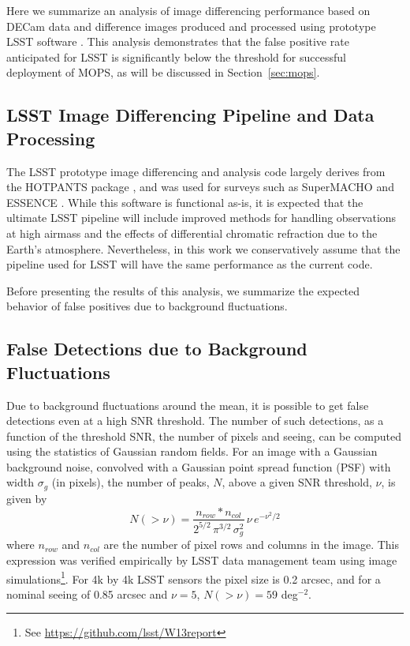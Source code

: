 Here we summarize an analysis of image differencing performance based on DECam
data and difference images produced and processed using prototype LSST
software \citep{DMTN-006}. This analysis demonstrates that the false
positive rate anticipated for LSST is significantly below the threshold for
successful deployment of MOPS, as will be discussed in Section~\ref{sec:mops}.

\subsection{LSST Image Differencing Pipeline and Data Processing}

The LSST prototype image differencing and analysis code largely derives from the
HOTPANTS package \citep{becker15}, and was used for surveys such as SuperMACHO
\citep{becker05} and ESSENCE \citep{miknaitis07}. While this software is
functional as-is, it is expected that the ultimate LSST pipeline will include
improved methods for handling observations at high airmass and the effects of
differential chromatic refraction due to the Earth's atmosphere. Nevertheless, in
this work we conservatively assume that the pipeline used for LSST will have the
same performance as the current code.

Before presenting the results of this analysis, we summarize the expected behavior
of false positives due to background fluctuations.


\subsection{False Detections due to Background Fluctuations \label{sec:kaiser}}

Due to background fluctuations around the mean, it is possible to get false
detections even at a high SNR threshold. The number of
such detections, as a function of the threshold SNR, the number of pixels and
seeing, can be computed using the statistics of Gaussian random fields.
For an image with a Gaussian background noise, convolved with a Gaussian point
spread function (PSF) with width $\sigma_g$ (in pixels), the number of peaks, $N$, above a
given SNR threshold, $\nu$, is given by
\begin{equation}
N(>\nu)  = \frac{n_{row}*n_{col}}{2^{5/2} \, \pi^{3/2} \, \sigma_g^2} \, \nu \, e^{-\nu^2 /2}
\label{eq-theory}
\end{equation}
where $n_{row}$ and $n_{col}$ are the number of pixel rows and columns in the image.
This expression was verified empirically by LSST data management team using
image simulations\footnote{See \url{https://github.com/lsst/W13report}}.
For 4k by 4k LSST sensors the pixel size is 0.2 arcsec, and for a nominal seeing
of 0.85 arcsec and $\nu=5$, $N(>\nu) = 59$ deg$^{-2}$.

